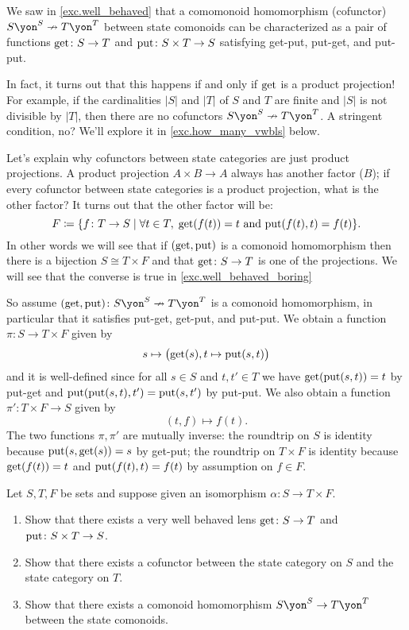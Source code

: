 \documentclass[Book-Poly]{subfiles}
\begin{document}
\begin{example}\label{ex.well_behaved_boring}
We saw in \cref{exc.well_behaved} that a comomonoid homomorphism (cofunctor) $S\yon^S\cof T\yon^T$ between state comonoids can be characterized as a pair of functions $\mathrm{get}\colon S\to T$ and $\mathrm{put}\colon S\times T\to S$ satisfying get-put, put-get, and put-put. 

In fact, it turns out that this happens if and only if $\mathrm{get}$ is a product projection! For example, if the cardinalities $|S|$ and $|T|$ of $S$ and $T$ are finite and $|S|$ is not divisible by $|T|$, then there are no cofunctors $S\yon^S\cof T\yon^T$. A stringent condition, no? We'll explore it in  \cref{exc.how_many_vwbls} below.

Let's explain why cofunctors between state categories are just product projections. A product projection $A\times B\to A$ always has another factor ($B$); if every cofunctor between state categories is a product projection, what is the other factor? It turns out that the other factor will be:
\[
F\coloneqq\{f\colon T\to S\mid \forall t\in T,\;\mathrm{get}(f(t))=t\text{ and }\mathrm{put}(f(t),t)=f(t)\}.
\]
In other words we will see that if $(\mathrm{get},\mathrm{put})$ is a comonoid homomorphism then there is a bijection $S\cong T\times F$ and that $\mathrm{get}\colon S\to T$ is one of the projections. We will see that the converse is true in \cref{exc.well_behaved_boring}

So assume $(\lensget,\lensput)\colon S\yon^S\cof T\yon^T$ is a comonoid homomorphism, in particular that it satisfies put-get, get-put, and put-put. We obtain a function $\pi\colon S\to T\times F$ given by
\[s\mapsto\big(\mathrm{get}(s),t\mapsto\mathrm{put}(s,t)\big)\]
and it is well-defined since for all $s\in S$ and $t,t'\in T$ we have $\mathrm{get}(\mathrm{put}(s,t))=t$ by put-get and $\mathrm{put}(\mathrm{put}(s,t),t')=\mathrm{put}(s,t')$ by put-put. We also obtain a function $\pi'\colon T\times F\to S$ given by
\[
(t,f)\mapsto f(t).
\]
The two functions $\pi,\pi'$ are mutually inverse: the roundtrip on $S$ is identity because $\mathrm{put}(s,\mathrm{get}(s))=s$ by get-put; the roundtrip on $T\times F$ is identity because $\mathrm{get}(f(t))=t$ and $\mathrm{put}(f(t),t)=f(t)$ by assumption on $f\in F$.
\end{example}

\begin{exercise}\label{exc.well_behaved_boring}
Let $S,T,F$ be sets and suppose given an isomorphism $\alpha\colon S\to T\times F$.
\begin{enumerate}
	\item Show that there exists a very well behaved lens $\mathrm{get}\colon S\to T$ and $\mathrm{put}\colon S\times T\to S$.
	\item Show that there exists a cofunctor between the state category on $S$ and the state category on $T$.
	\item Show that there exists a comonoid homomorphism $S\yon^S\to T\yon^T$ between the state comonoids.
\qedhere
\end{enumerate}
\end{exercise}
\end{document}
